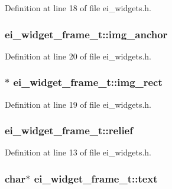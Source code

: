 Definition at line 18 of file ei\-\_\-widgets.\-h.

\hypertarget{structei__widget__frame__t_ab3fa3932c7b01d8495e1f974d02deacc}{
\subsubsection[{img\-\_\-anchor}]{ ei\-\_\-widget\-\_\-frame\-\_\-t\-::img\-\_\-anchor}}\label{structei__widget__frame__t_ab3fa3932c7b01d8495e1f974d02deacc}


Definition at line 20 of file ei\-\_\-widgets.\-h.

\hypertarget{structei__widget__frame__t_a84c1c35a4c8ed8c0d7f07900d8683fdf}{
\subsubsection[{img\-\_\-rect}]{$\ast$ ei\-\_\-widget\-\_\-frame\-\_\-t\-::img\-\_\-rect}}\label{structei__widget__frame__t_a84c1c35a4c8ed8c0d7f07900d8683fdf}


Definition at line 19 of file ei\-\_\-widgets.\-h.

\hypertarget{structei__widget__frame__t_ac5136274703286fdba8a9de420efc9e4}{
\subsubsection[{relief}]{ ei\-\_\-widget\-\_\-frame\-\_\-t\-::relief}}\label{structei__widget__frame__t_ac5136274703286fdba8a9de420efc9e4}


Definition at line 13 of file ei\-\_\-widgets.\-h.

\hypertarget{structei__widget__frame__t_a44b96f7744db6a85b1d44195f636c37c}{
\subsubsection[{text}]{\setlength{\rightskip}{0pt plus 5cm}char$\ast$ ei\-\_\-widget\-\_\-frame\-\_\-t\-::text}}\label{structei__widget__frame__t_a44b96f7744db6a85b1d44195f636c37c}


